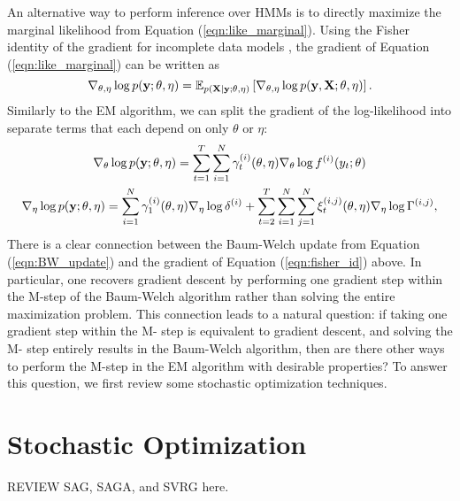 An alternative way to perform inference over HMMs is to directly maximize the marginal likelihood from Equation (\ref{eqn:like_marginal}). Using the Fisher identity of the gradient for incomplete data models \citep{Fisher:1925}, the gradient of Equation (\ref{eqn:like_marginal}) can be written as
%
\begin{equation}
    \nabla_{\theta,\eta} \log p(\mathbf{y};\theta,\eta) = \mathbb{E}_{p(\mathbf{X} \mid \mathbf{y};\theta,\eta)}\left[ \nabla_{\theta,\eta} \log p(\mathbf{y},\mathbf{X};\theta,\eta) \right].
    \label{eqn:fisher_id}
\end{equation}
%
Similarly to the EM algorithm, we can split the gradient of the log-likelihood into separate terms that each depend on only $\theta$ or $\eta$:
%
\begin{gather}
    \nabla_{\theta} \log p(\mathbf{y};\theta,\eta) = \sum_{t=1}^T \sum_{i=1}^N \gamma_t^{(i)}(\theta,\eta) \nabla_{\theta} \log f^{(i)}(y_t; \theta) \label{eqn:theta_update_gd} \\
    \nabla_{\eta} \log p(\mathbf{y};\theta,\eta) = \sum_{i=1}^N \gamma_1^{(i)}(\theta,\eta) \nabla_{\eta} \log \delta^{(i)} + \sum_{t=2}^{T} \sum_{i=1}^N \sum_{j=1}^N \xi_t^{(i,j)}(\theta,\eta) \nabla_{\eta} \log \Gamma^{(i,j)}, \label{eqn:eta_update_gd}
\end{gather}
%
There is a clear connection between the Baum-Welch update from Equation (\ref{eqn:BW_update}) and the gradient of Equation (\ref{eqn:fisher_id}) above. In particular, one recovers gradient descent by performing one gradient step within the M-step of the Baum-Welch algorithm rather than solving the entire maximization problem. This connection leads to a natural question: if taking one gradient step within the M- step is equivalent to gradient descent, and solving the M- step entirely results in the Baum-Welch algorithm, then are there other ways to perform the M-step in the EM algorithm with desirable properties? To answer this question, we first review some stochastic optimization techniques.

\section{Stochastic Optimization}

REVIEW SAG, SAGA, and SVRG here.